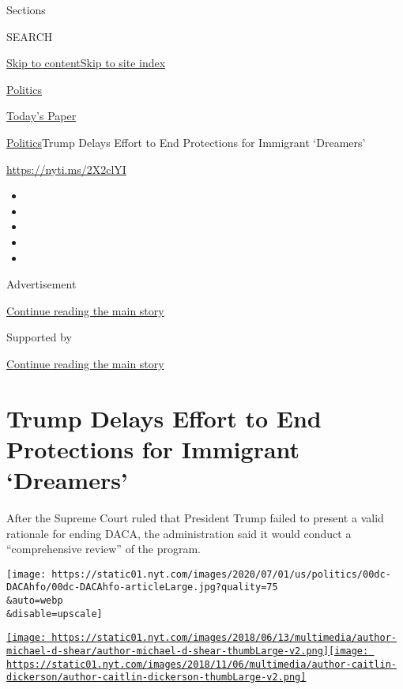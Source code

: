 Sections

SEARCH

\protect\hyperlink{site-content}{Skip to
content}\protect\hyperlink{site-index}{Skip to site index}

\href{https://www.nytimes.com/section/politics}{Politics}

\href{https://myaccount.nytimes.com/auth/login?response_type=cookie\&client_id=vi}{}

\href{https://www.nytimes.com/section/todayspaper}{Today's Paper}

\href{/section/politics}{Politics}\textbar{}Trump Delays Effort to End
Protections for Immigrant `Dreamers'

\url{https://nyti.ms/2X2clYI}

\begin{itemize}
\item
\item
\item
\item
\item
\end{itemize}

Advertisement

\protect\hyperlink{after-top}{Continue reading the main story}

Supported by

\protect\hyperlink{after-sponsor}{Continue reading the main story}

\hypertarget{trump-delays-effort-to-end-protections-for-immigrant-dreamers}{%
\section{Trump Delays Effort to End Protections for Immigrant
`Dreamers'}\label{trump-delays-effort-to-end-protections-for-immigrant-dreamers}}

After the Supreme Court ruled that President Trump failed to present a
valid rationale for ending DACA, the administration said it would
conduct a ``comprehensive review'' of the program.

\texttt{[image: https://static01.nyt.com/images/2020/07/01/us/politics/00dc-DACAhfo/00dc-DACAhfo-articleLarge.jpg?quality=75\\\&auto=webp\\\&disable=upscale]}

\href{https://www.nytimes.com/by/michael-d-shear}{\texttt{[image: https://static01.nyt.com/images/2018/06/13/multimedia/author-michael-d-shear/author-michael-d-shear-thumbLarge-v2.png]}}\href{https://www.nytimes.com/by/caitlin-dickerson}{\texttt{[image: https://static01.nyt.com/images/2018/11/06/multimedia/author-caitlin-dickerson/author-caitlin-dickerson-thumbLarge-v2.png]}}

